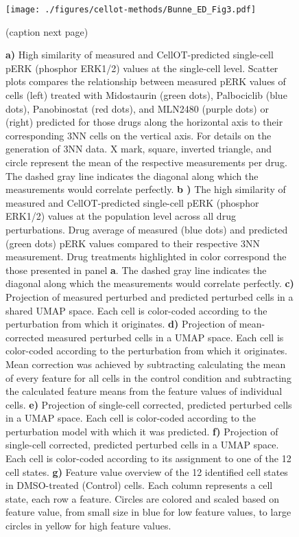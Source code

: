 \begin{figure}[b!]
    \centering
    \texttt{[image: ./figures/cellot-methods/Bunne\_ED\_Fig3.pdf]}
    \caption{(caption next page)}
    \label{supp_fig:4i_analysis_extended}
\end{figure}
\addtocounter{figure}{-1}
\begin{figure}[t!]
\caption{\textbf{a)} High similarity of measured and CellOT-predicted single-cell pERK (phosphor ERK1/2) values at the single-cell level. Scatter plots compares the relationship between measured pERK values of cells (left) treated with Midostaurin (green dots), Palbociclib (blue dots), Panobinostat (red dots), and MLN2480 (purple dots) or (right) predicted for those drugs along the horizontal axis to their corresponding 3NN cells on the vertical axis. For details on the generation of 3NN data. X mark, square, inverted triangle, and circle represent the mean of the respective measurements per drug. The dashed gray line indicates the diagonal along which the measurements would correlate perfectly. \textbf{b )} The high similarity of measured and CellOT-predicted single-cell pERK (phosphor ERK1/2) values at the population level across all drug perturbations. Drug average of measured (blue dots) and predicted (green dots) pERK values compared to their respective 3NN measurement. Drug treatments highlighted in color correspond the those presented in panel \textbf{a}. The dashed gray line indicates the diagonal along which the measurements would correlate perfectly. \textbf{c)} Projection of measured perturbed and predicted perturbed cells in a shared UMAP space. Each cell is color-coded according to the perturbation from which it originates. \textbf{d)} Projection of mean-corrected measured perturbed cells in a UMAP space. Each cell is color-coded according to the perturbation from which it originates. Mean correction was achieved by subtracting calculating the mean of every feature for all cells in the control condition and subtracting the calculated feature means from the feature values of individual cells. \textbf{e)} Projection of single-cell corrected, predicted perturbed cells in a UMAP space. Each cell is color-coded according to the perturbation model with which it was predicted. \textbf{f)} Projection of single-cell corrected, predicted perturbed cells in a UMAP space. Each cell is color-coded according to its assignment to one of the 12 cell states. \textbf{g)} Feature value overview of the 12 identified cell states in DMSO-treated (Control) cells. Each column represents a cell state, each row a feature. Circles are colored and scaled based on feature value, from small size in blue for low feature values, to large circles in yellow for high feature values.
}
\end{figure}
